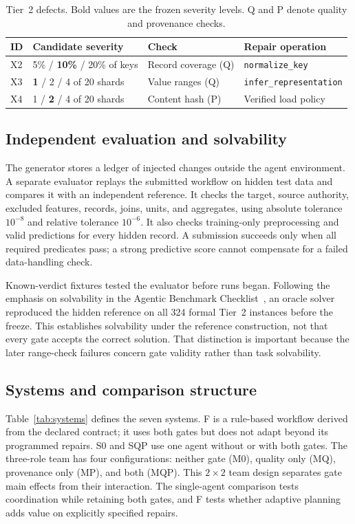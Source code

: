 \documentclass[conference]{IEEEtran}
\newcommand{\sys}[1]{\textsf{#1}}
\newcommand{\code}[1]{\texttt{#1}}
\begin{document}
\begin{table}[t]
\caption{Tier~2 defects. Bold values are the frozen severity levels. Q and P denote quality and provenance checks.}
\label{tab:tier2}
\centering\footnotesize\setlength{\tabcolsep}{3pt}
\begin{tabularx}{\columnwidth}{@{}lp{}p{}Y@{}}
\toprule
ID & Candidate severity & Check & Repair operation \\
\midrule
X2 & 5\% / \textbf{10\%} / 20\% of keys & Record coverage (Q) & \code{\scriptsize normalize\_key} \\
X3 & \textbf{1} / 2 / 4 of 20 shards & Value ranges (Q) & \code{\scriptsize infer\_representation} \\
X4 & 1 / \textbf{2} / 4 of 20 shards & Content hash (P) & Verified load policy \\
\bottomrule
\end{tabularx}
\end{table}

\subsection{Independent evaluation and solvability}
The generator stores a ledger of injected changes outside the agent environment. A separate evaluator replays the submitted workflow on hidden test data and compares it with an independent reference. It checks the target, source authority, excluded features, records, joins, units, and aggregates, using absolute tolerance $10^{-8}$ and relative tolerance $10^{-6}$. It also checks training-only preprocessing and valid predictions for every hidden record. A submission succeeds only when all required predicates pass; a strong predictive score cannot compensate for a failed data-handling check.

Known-verdict fixtures tested the evaluator before runs began. Following the emphasis on solvability in the Agentic Benchmark Checklist~\cite{zhu2025abc}, an oracle solver reproduced the hidden reference on all 324 formal Tier~2 instances before the freeze. This establishes solvability under the reference construction, not that every gate accepts the correct solution. That distinction is important because the later range-check failures concern gate validity rather than task solvability.

\subsection{Systems and comparison structure}
\label{sec:systems}
Table~\ref{tab:systems} defines the seven systems. \sys{F} is a rule-based workflow derived from the declared contract; it uses both gates but does not adapt beyond its programmed repairs. \sys{S0} and \sys{SQP} use one agent without or with both gates. The three-role team has four configurations: neither gate (\sys{M0}), quality only (\sys{MQ}), provenance only (\sys{MP}), and both (\sys{MQP}). This $2\times2$ team design separates gate main effects from their interaction. The single-agent comparison tests coordination while retaining both gates, and \sys{F} tests whether adaptive planning adds value on explicitly specified repairs.
\end{document}
